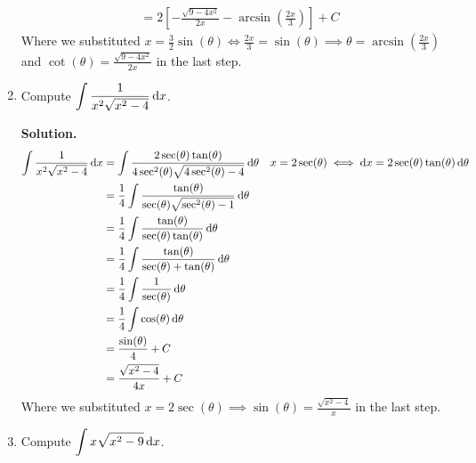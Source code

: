 \begin{Example}{}{}
\begin{enumerate}[label=(\roman*)]
\begin{align*}
                   & =2\left[ -\frac{\sqrt{9-4x^2}}{2x}-\arcsin\left( \frac{2x}{3} \right) \right]+C
              \end{align*}
              Where we substituted $ \displaystyle
                  x=\frac{3}{2}\sin(\theta)\iff \frac{2x}{3}=\sin(\theta)\implies
                  \theta=\arcsin\left( \frac{2x}{3} \right) $ and $
                  \displaystyle \cot(\theta)=
                  \frac{\sqrt{9-4x^2}}{2x} $ in the last step.
        \item Compute $ \displaystyle \int \frac{1}{x^2\sqrt{x^2-4}} \odif{x} $.

              \textbf{Solution.}
              \begin{align*}
                  \int \frac{1}{x^2\sqrt{x^2-4}} \odif{x}
                   & =\int \frac{2\sec(\theta)\tan(\theta)}{4\sec^2(\theta)\sqrt{4\sec^2(\theta)-4}} \odif{\theta} &  & x=2\sec(\theta)\iff \odif{x}=2\sec(\theta)\tan(\theta)\odif{\theta} \\
                   & =\frac{1}{4} \int \frac{\tan(\theta)}{\sec(\theta)\sqrt{\sec^2(\theta)-1}}\odif{\theta}                                                                                \\
                   & =\frac{1}{4} \int \frac{\tan(\theta)}{\sec(\theta)\tan(\theta)} \odif{\theta}                                                                                          \\
                   & =\frac{1}{4} \int \frac{\tan(\theta)}{\sec(\theta)+\tan(\theta)} \odif{\theta}                                                                                         \\
                   & =\frac{1}{4} \int \frac{1}{\sec(\theta)} \odif{\theta}                                                                                                                 \\
                   & =\frac{1}{4} \int \cos(\theta)\odif{\theta}                                                                                                                            \\
                   & =\frac{\sin(\theta)}{4} +C                                                                                                                                             \\
                   & =\frac{\sqrt{x^2-4}}{4x} +C
              \end{align*}
              Where we substituted $ \displaystyle x=2\sec(\theta)\implies \sin(\theta)=\frac{\sqrt{x^2-4}}{x} $
              in the last step.
        \item Compute $ \displaystyle \int x\sqrt{x^2-9}\odif{x} $.


\end{enumerate}
\end{Example}
